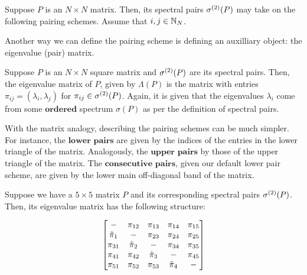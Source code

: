 \newpage
{}
Suppose $P$ is an $N \times N$ matrix. Then, its spectral pairs ${\sigma^{(2)}}(P)$ may take on the following pairing schemes. Assume that $i,j \in \mathbb{N}_N$. \newline
\begin{center}
\pairingschemetableNOIJ %
\end{center}
\vspace{1em}

\noindent Another way we can define the pairing scheme is defining an auxilliary object: the eigenvalue (pair) matrix.

\medskip
{}
\begin{definition}
Suppose $P$ is an $N \times N$ square matrix and ${\sigma^{(2)}}(P)$ are its spectral pairs.
Then, the eigenvalue matrix of $P$, given by $\Lambda(P)$ is the matrix with entries $\pi_{ij} = (\lambda_i, \lambda_j)$ for ${\pi_{ij}} \in {\sigma^{(2)}}(P)$.
Again, it is given that the eigenvalues $\lambda_i$ come from some $\textbf{ordered}$ spectrum $\sigma(P)$ as per the definition of spectral pairs.
\end{definition}

With the matrix analogy, describing the pairing schemes can be much simpler.
For instance, the $\textbf{lower pairs}$ are given by the indices of the entries in the lower triangle of the matrix.
Analogously, the $\textbf{upper pairs}$ by those of the upper triangle of the matrix.
The $\textbf{consecutive pairs}$, given our default lower pair scheme, are given by the lower main off-diagonal band of the matrix.

\begin{example}
Suppose we have a $5 \times 5$ matrix $P$ and its corresponding spectral pairs ${\sigma^{(2)}}(P)$. Then, its eigenvalue matrix has the following structure:
\end{example}
$$
\begin{bmatrix}
-      & \pi_{12} & \pi_{13}   & \pi_{14} & \pi_{15} \\
{\tilde{\pi}}_{1} & -      & \pi_{23}   & \pi_{24} & \pi_{25} \\
\pi_{31} & {\tilde{\pi}}_{2} & -        & \pi_{34} & \pi_{35} \\
\pi_{41} & \pi_{42} & {\tilde{\pi}}_{3} & -        & \pi_{45} \\
\pi_{51} & \pi_{52} & \pi_{53} & {\tilde{\pi}}_{4} & -        \\
\end{bmatrix}
$$
\newline

